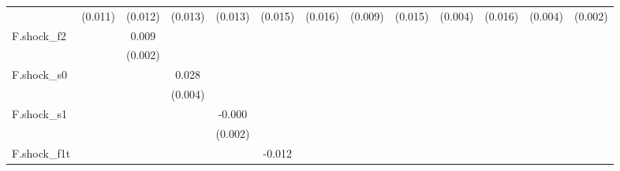 {\begin{tabular}{l*{12}{c}}
            &     (0.011)         &     (0.012)         &     (0.013)         &     (0.013)         &     (0.015)         &     (0.016)         &     (0.009)         &     (0.015)         &     (0.004)         &     (0.016)         &     (0.004)         &     (0.002)         \\
\addlinespace
F.shock\_f2  &                     &       0.009\sym{***}&                     &                     &                     &                     &                     &                     &                     &                     &                     &                     \\
            &                     &     (0.002)         &                     &                     &                     &                     &                     &                     &                     &                     &                     &                     \\
\addlinespace
F.shock\_s0  &                     &                     &       0.028\sym{***}&                     &                     &                     &                     &                     &                     &                     &                     &                     \\
            &                     &                     &     (0.004)         &                     &                     &                     &                     &                     &                     &                     &                     &                     \\
\addlinespace
F.shock\_s1  &                     &                     &                     &      -0.000         &                     &                     &                     &                     &                     &                     &                     &                     \\
            &                     &                     &                     &     (0.002)         &                     &                     &                     &                     &                     &                     &                     &                     \\
\addlinespace
F.shock\_f1t &                     &                     &                     &                     &      -0.012\sym{*}  &                     &                     &                     &                     &                     &                     &                     \\

\end{tabular}}
